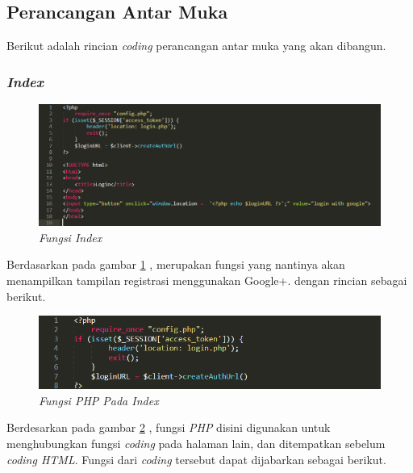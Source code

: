 \subsection{Perancangan Antar Muka}
\par
Berikut adalah rincian \textit{coding} perancangan antar muka yang akan dibangun.

\subsubsection{\textit{Index}}

\begin{figure}[!htbp]
    \centering
    \includegraphics[scale=0.5]{gambar/index}
    \caption{\textit{Fungsi Index}}
    \label{index}
\end{figure}


\par
Berdasarkan pada gambar \ref{index} , merupakan fungsi yang nantinya akan menampilkan tampilan registrasi menggunakan Google+. dengan rincian sebagai berikut.

\begin{figure}[!htbp]
    \centering
    \includegraphics[scale=0.5]{gambar/indexphp}
    \caption{\textit{Fungsi PHP Pada Index}}
    \label{indexphp}
\end{figure}

\par 
Berdesarkan pada gambar \ref{indexphp} , fungsi \textit{PHP} disini digunakan untuk menghubungkan fungsi \textit{coding} pada halaman lain, dan ditempatkan sebelum \textit{coding HTML}. Fungsi dari \textit{coding} tersebut dapat dijabarkan sebagai berikut.
\\
\\
\\

